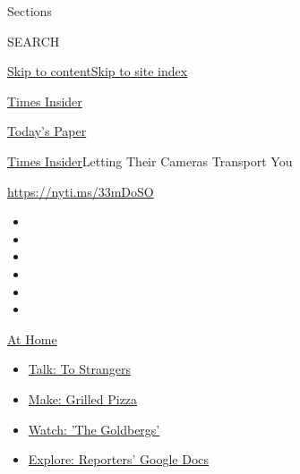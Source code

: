 Sections

SEARCH

\protect\hyperlink{site-content}{Skip to
content}\protect\hyperlink{site-index}{Skip to site index}

\href{https://www.nytimes3xbfgragh.onion/section/reader-center}{Times
Insider}

\href{https://myaccount.nytimes3xbfgragh.onion/auth/login?response_type=cookie\&client_id=vi}{}

\href{https://www.nytimes3xbfgragh.onion/section/todayspaper}{Today's
Paper}

\href{/section/reader-center}{Times Insider}\textbar{}Letting Their
Cameras Transport You

\href{https://nyti.ms/33mDoSO}{https://nyti.ms/33mDoSO}

\begin{itemize}
\item
\item
\item
\item
\item
\item
\end{itemize}

\href{https://www.nytimes3xbfgragh.onion/spotlight/at-home?action=click\&pgtype=Article\&state=default\&region=TOP_BANNER\&context=at_home_menu}{At
Home}

\begin{itemize}
\tightlist
\item
  \href{https://www.nytimes3xbfgragh.onion/2020/08/03/well/family/the-benefits-of-talking-to-strangers.html?action=click\&pgtype=Article\&state=default\&region=TOP_BANNER\&context=at_home_menu}{Talk:
  To Strangers}
\item
  \href{https://www.nytimes3xbfgragh.onion/2020/08/01/at-home/coronavirus-make-pizza-on-a-grill.html?action=click\&pgtype=Article\&state=default\&region=TOP_BANNER\&context=at_home_menu}{Make:
  Grilled Pizza}
\item
  \href{https://www.nytimes3xbfgragh.onion/2020/07/31/arts/television/goldbergs-abc-stream.html?action=click\&pgtype=Article\&state=default\&region=TOP_BANNER\&context=at_home_menu}{Watch:
  'The Goldbergs'}
\item
  \href{https://www.nytimes3xbfgragh.onion/interactive/2020/at-home/even-more-reporters-editors-diaries-lists-recommendations.html?action=click\&pgtype=Article\&state=default\&region=TOP_BANNER\&context=at_home_menu}{Explore:
  Reporters' Google Docs}
\end{itemize}

